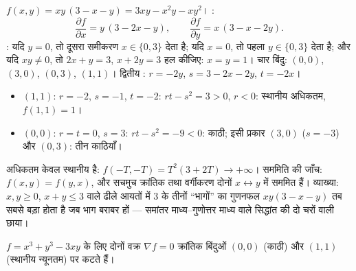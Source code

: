 \begin{example}[चार बिंदुओं का पूरा अध्ययन]
\label{ex:b1:multivar:fourpoints}
$f(x, y) = xy\,(3 - x - y) = 3xy - x^2y - xy^2$। :
\[
\frac{\partial f}{\partial x} = y\,(3 - 2x - y),
\qquad
\frac{\partial f}{\partial y} = x\,(3 - x - 2y).
\]
: यदि $y = 0$, तो दूसरा समीकरण $x \in \{0, 3\}$ देता है; यदि
$x = 0$, तो पहला $y \in \{0, 3\}$ देता है; और यदि $xy \neq 0$, तो $2x + y =
3$, $x + 2y = 3$ हल कीजिए: $x = y = 1$। चार बिंदु: $(0,0)$, $(3,0)$,
$(0,3)$, $(1,1)$। द्वितीय : $r = -2y$, $s = 3 - 2x - 2y$, $t = -2x$।
\begin{itemize}
  \item $(1,1)$: $r = -2$, $s = -1$, $t = -2$: $rt - s^2 = 3 > 0$, $r <
        0$: स्थानीय अधिकतम, $f(1,1) = 1$।
  \item $(0,0)$: $r = t = 0$, $s = 3$: $rt - s^2 = -9 < 0$: काठी; इसी
        प्रकार $(3, 0)$ ($s = -3$) और $(0, 3)$: तीन काठियाँ।
\end{itemize}
अधिकतम केवल स्थानीय है: $f(-T, -T) = T^2(3 + 2T) \to +\infty$। सममिति की
जाँच: $f(x, y) = f(y, x)$, और सचमुच क्रांतिक  तथा वर्गीकरण दोनों $x
\leftrightarrow y$ में सममित हैं। व्याख्या: $x, y \geq 0$, $x + y \leq 3$
वाले ढीले आयतों में $3$ के तीनों ``भागों'' का गुणनफल $xy(3 - x - y)$ तब
सबसे बड़ा होता है जब भाग बराबर हों --- समांतर माध्य--गुणोत्तर माध्य वाले
सिद्धांत की दो चरों वाली छाया।
\end{example}

\begin{omfigure}

{\small $f = x^3 + y^3 - 3xy$ के लिए दोनों वक्र $\nabla f = 0$ क्रांतिक
बिंदुओं $(0,0)$ (काठी) और $(1,1)$ (स्थानीय न्यूनतम) पर कटते हैं।}
\end{omfigure}

